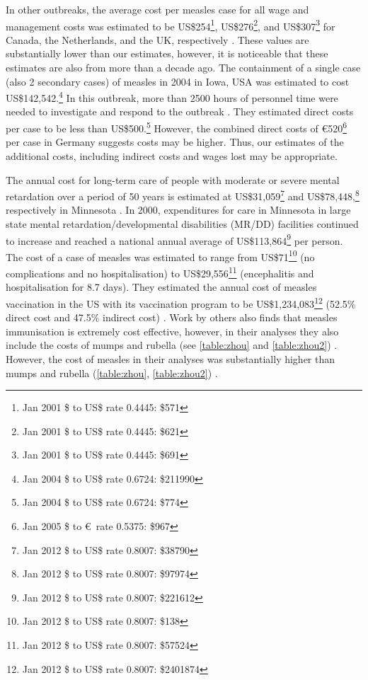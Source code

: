 \documentclass{article}
\begin{document}
In other outbreaks, the average cost per measles case for all wage and management costs was estimated to be US\$254\footnote{Jan 2001 \$ to US\$ rate 0.4445: \$571}, US\$276\footnote{Jan 2001 \$ to US\$ rate 0.4445: \$621}, and US\$307\footnote{Jan 2001 \$ to US\$ rate 0.4445: \$691} for Canada, the Netherlands, and the UK, respectively  \citep{carabin2}. These values are substantially lower than our estimates, however, it is noticeable that these estimates are also from more than a decade ago. The containment of a single case (also 2 secondary cases) of measles in 2004 in Iowa, USA was estimated to cost US\$142,542.\footnote{Jan 2004 \$ to US\$ rate 0.6724: \$211990} In this outbreak, more than 2500 hours of personnel time were needed to investigate and respond to the outbreak \citep{dayan5}. They estimated direct costs per case to be less than US\$500.\footnote{Jan 2004 \$ to US\$ rate 0.6724: \$774} However, the combined direct costs of \euro 520\footnote{Jan 2005 \$ to \euro\ rate 0.5375: \$967} per case in Germany \citep{siedler6} suggests costs may be higher. Thus, our estimates of the additional costs, including indirect costs and wages lost may be appropriate.

The annual cost for long-term care of people with moderate or severe mental retardation over a period of 50 years is estimated at US\$31,059\footnote{Jan 2012 \$ to US\$ rate 0.8007: \$38790} and US\$78,448,\footnote{Jan 2012 \$ to US\$ rate 0.8007: \$97974} respectively in Minnesota \citep{prouty1}. In 2000, expenditures for care in Minnesota in large state mental retardation/developmental disabilities (MR/DD) facilities continued to increase and reached a national annual average of US\$113,864\footnote{Jan 2012 \$ to US\$ rate 0.8007: \$221612} per person. The cost of a case of measles was estimated to range from US\$71\footnote{Jan 2012 \$ to US\$ rate 0.8007: \$138} (no complications and no hospitalisation) to US\$29,556\footnote{Jan 2012 \$ to US\$ rate 0.8007: \$57524} (encephalitis and hospitalisation for 8.7 days). They estimated the annual cost of measles vaccination in the US with its vaccination program to be US\$1,234,083\footnote{Jan 2012 \$ to US\$ rate 0.8007: \$2401874} (52.5\% direct cost and 47.5\% indirect cost) \citep{zhou4}. Work by others also finds that measles immunisation is extremely cost effective, however, in their analyses they also include the costs of mumps and rubella (see \autoref{table:zhou} and \autoref{table:zhou2}) \citep{zhou4}. However, the cost of measles in their analyses was substantially higher than mumps and rubella (\autoref{table:zhou}, \autoref{table:zhou2}) \citep{zhou4}.
\end{document}

